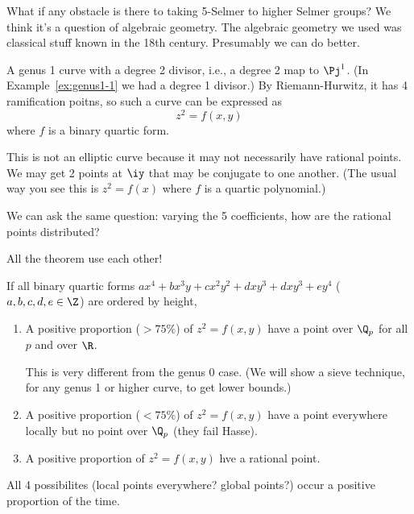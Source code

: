 What if any obstacle is there to taking 5-Selmer to higher Selmer groups? We think it's a question of algebraic geometry. The algebraic geometry we used was classical stuff known in the 18th century. Presumably we can do better. %

\begin{ex}
A genus 1 curve with a degree 2 divisor, i.e., a degree 2 map to $\Pj^1$. (In Example~\ref{ex:genus1-1} we had a degree 1 divisor.)
By Riemann-Hurwitz, it has 4 ramification poitns, so such a curve can be expressed as 
\[
z^2 = f(x,y)
\]
where $f$ is a binary quartic form.

This is not an elliptic curve because it may not necessarily have rational points. We may get 2 points at $\iy$ that may be conjugate to one another. 
(The usual way you see this is $z^2 = f(x)$ where $f$ is a quartic polynomial.)

We can ask the same question: varying the 5 coefficients, how are the rational points distributed?
\end{ex}

All the theorem use each other!
\begin{thm}
If all binary quartic forms $ax^4+bx^3y+cx^2y^2 + dxy^3 + dxy^3 + ey^4$ ($a,b,c,d,e\in \Z$) are ordered by height, 
\begin{enumerate}
\item A positive proportion ($>75\%$) of $z^2=f(x,y)$ have a point over $\Q_p$ for all $p$ and over $\R$.

This is very different from the genus 0 case. %
(We will show a sieve technique, for any genus 1 or higher curve, to get lower bounds.)
\item
A positive proportion ($<75\%$) of $z^2=f(x,y)$ have a point everywhere locally but no point over $\Q_p$ (they fail Hasse). 
\item
A positive proportion of $z^2=f(x,y)$ hve a rational point. %
\end{enumerate}
\end{thm}
All 4 possibilites (local points everywhere? global points?) occur a positive proportion of the time. 

